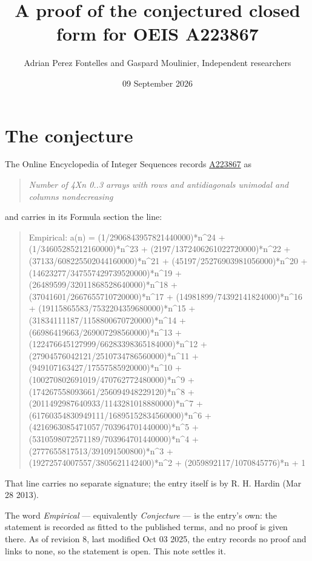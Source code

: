 \documentclass[11pt]{article}
\title{A proof of the conjectured closed form for OEIS A223867}
\author{Adrian Perez Fontelles and Gaspard Moulinier, Independent researchers}
\date{09 September 2026}
\theoremstyle{definition}
\begin{document}
\maketitle
\section{The conjecture}

The Online Encyclopedia of Integer Sequences records \href{https://oeis.org/A223867}{A223867} as

\begin{quote}\itshape Number of 4Xn 0..3 arrays with rows and antidiagonals unimodal and columns nondecreasing\end{quote}

and carries in its Formula section the line:

\begin{quote}\ttfamily Empirical: a(n) = (1/2906843957821440000)*n\textasciicircum{}24 + (1/34605285212160000)*n\textasciicircum{}23 + (2197/1372406261022720000)*n\textasciicircum{}22 + (37133/608225502044160000)*n\textasciicircum{}21 + (45197/25276903981056000)*n\textasciicircum{}20 + (14623277/347557429739520000)*n\textasciicircum{}19 + (26489599/32011868528640000)*n\textasciicircum{}18 + (37041601/2667655710720000)*n\textasciicircum{}17 + (14981899/74392141824000)*n\textasciicircum{}16 + (19115865583/7532204359680000)*n\textasciicircum{}15 + (31834111187/1158800670720000)*n\textasciicircum{}14 + (66986419663/269007298560000)*n\textasciicircum{}13 + (122476645127999/66283398365184000)*n\textasciicircum{}12 + (27904576042121/2510734786560000)*n\textasciicircum{}11 + (949107163427/17557585920000)*n\textasciicircum{}10 + (100270802691019/470762772480000)*n\textasciicircum{}9 + (174267558093661/256094948229120)*n\textasciicircum{}8 + (2011492987640933/1143281018880000)*n\textasciicircum{}7 + (61760354830949111/16895152834560000)*n\textasciicircum{}6 + (4216963085471057/703964701440000)*n\textasciicircum{}5 + (5310598072571189/703964701440000)*n\textasciicircum{}4 + (2777655817513/391091500800)*n\textasciicircum{}3 + (19272574007557/3805621142400)*n\textasciicircum{}2 + (2059892117/1070845776)*n + 1\end{quote}

That line carries no separate signature; the entry itself is by R. H. Hardin (Mar 28 2013).

The word {\itshape Empirical} --- equivalently {\itshape Conjecture} --- is the entry's own: the statement is recorded as fitted to the published terms, and no proof is given there. As of revision 8, last modified Oct 03 2025, the entry records no proof and links to none, so the statement is open. This note settles it.
\end{document}
